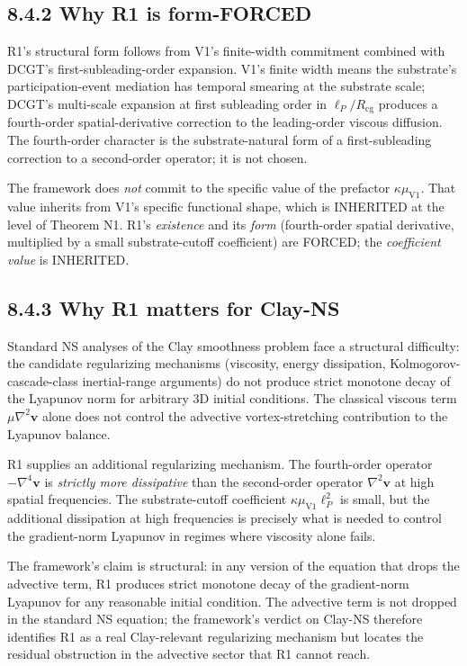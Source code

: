 \documentclass[11pt]{book}
\begin{document}
\subsection{8.4.2 Why R1 is form-FORCED}

R1's structural form follows from V1's finite-width commitment combined with DCGT's first-subleading-order expansion. V1's finite width means the substrate's participation-event mediation has temporal smearing at the substrate scale; DCGT's multi-scale expansion at first subleading order in $\ell_P/R_\mathrm{cg}$ produces a fourth-order spatial-derivative correction to the leading-order viscous diffusion. The fourth-order character is the substrate-natural form of a first-subleading correction to a second-order operator; it is not chosen.

The framework does \textit{not} commit to the specific value of the prefactor $\kappa\mu_{\mathrm{V1}}$. That value inherits from V1's specific functional shape, which is INHERITED at the level of Theorem N1. R1's \textit{existence} and its \textit{form} (fourth-order spatial derivative, multiplied by a small substrate-cutoff coefficient) are FORCED; the \textit{coefficient value} is INHERITED.

\subsection{8.4.3 Why R1 matters for Clay-NS}

Standard NS analyses of the Clay smoothness problem face a structural difficulty: the candidate regularizing mechanisms (viscosity, energy dissipation, Kolmogorov-cascade-class inertial-range arguments) do not produce strict monotone decay of the Lyapunov norm for arbitrary 3D initial conditions. The classical viscous term $\mu\nabla^2\mathbf{v}$ alone does not control the advective vortex-stretching contribution to the Lyapunov balance.

R1 supplies an additional regularizing mechanism. The fourth-order operator $-\nabla^4\mathbf{v}$ is \textit{strictly more dissipative} than the second-order operator $\nabla^2\mathbf{v}$ at high spatial frequencies. The substrate-cutoff coefficient $\kappa\mu_{\mathrm{V1}}\ell_P^2$ is small, but the additional dissipation at high frequencies is precisely what is needed to control the gradient-norm Lyapunov in regimes where viscosity alone fails.

The framework's claim is structural: in any version of the equation that drops the advective term, R1 produces strict monotone decay of the gradient-norm Lyapunov for any reasonable initial condition. The advective term is not dropped in the standard NS equation; the framework's verdict on Clay-NS therefore identifies R1 as a real Clay-relevant regularizing mechanism but locates the residual obstruction in the advective sector that R1 cannot reach.
\end{document}
